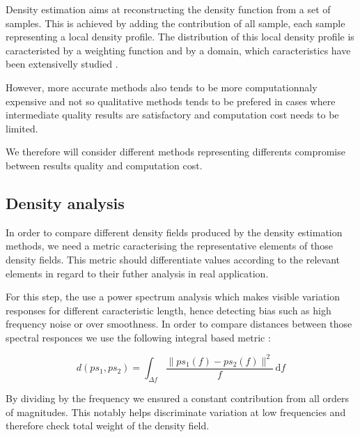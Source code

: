 \documentclass[10pt,a4paper,twoside,twocolumn]{article}
\newcommand*{\rootPath}{../}
\begin{document}
Density estimation aims at reconstructing the density function from a set of
samples. This is achieved by adding the contribution of all sample, each sample
representing a local density profile. The distribution of this local density
profile is caracteristed by a weighting function and by a domain, which
caracteristics have been extensivelly studied
.

However, more accurate methods also tends to be more computationnaly expensive
and not so qualitative methods tends to be prefered in cases where intermediate
quality results are satisfactory and computation cost needs to be limited.

We therefore will consider different methods representing differents compromise
between results quality and computation cost.

\subsection{Density analysis}

In order to compare different density fields produced by the density estimation
methods, we need a metric caracterising the representative elements of those
density fields. This metric should differentiate values according to the
relevant elements in regard to their futher analysis in real application.

For this step, the use a power spectrum analysis which makes visible variation
responses for different caracteristic length, hence detecting bias such as high
frequency noise or over smoothness. In order to compare distances between those
spectral responces we use the following integral based metric :

\begin{equation}
	d(ps_1, ps_2) = \int_{\Delta f}\frac{\|ps_1(f)-ps_2(f)\|^2}{f}\, \mathrm df
	\label{eq:psd_metric}
\end{equation}

By dividing by the frequency we ensured a constant contribution from all orders
of magnitudes. This notably helps discriminate variation at low frequencies and
therefore check total weight of the density field.

\ifstandalone
	
	
\fi
\end{document}
